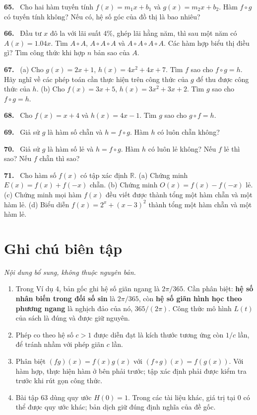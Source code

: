 \documentclass[12pt,a4paper]{article}
\newcommand{\bt}[1]{\par\smallskip\noindent\textbf{#1.}\ }
\begin{document}
\bt{65} Cho hai hàm tuyến tính $f(x)=m_1x+b_1$ và $g(x)=m_2x+b_2$. Hàm $f\circ g$ có tuyến tính không? Nếu có, hệ số góc của đồ thị là bao nhiêu?
\bt{66} Đầu tư $x$ đô la với lãi suất 4\%, ghép lãi hằng năm, thì sau một năm có $A(x)=1.04x$. Tìm $A\circ A$, $A\circ A\circ A$ và $A\circ A\circ A\circ A$. Các hàm hợp biểu thị điều gì? Tìm công thức khi hợp $n$ bản sao của $A$.
\bt{67} (a) Cho $g(x)=2x+1$, $h(x)=4x^2+4x+7$. Tìm $f$ sao cho $f\circ g=h$. Hãy nghĩ về các phép toán cần thực hiện trên công thức của $g$ để thu được công thức của $h$. (b) Cho $f(x)=3x+5$, $h(x)=3x^2+3x+2$. Tìm $g$ sao cho $f\circ g=h$.
\bt{68} Cho $f(x)=x+4$ và $h(x)=4x-1$. Tìm $g$ sao cho $g\circ f=h$.
\bt{69} Giả sử $g$ là hàm số chẵn và $h=f\circ g$. Hàm $h$ có luôn chẵn không?
\bt{70} Giả sử $g$ là hàm số lẻ và $h=f\circ g$. Hàm $h$ có luôn lẻ không? Nếu $f$ lẻ thì sao? Nếu $f$ chẵn thì sao?
\bt{71} Cho hàm số $f(x)$ có tập xác định $\mathbb R$. (a) Chứng minh $E(x)=f(x)+f(-x)$ chẵn. (b) Chứng minh $O(x)=f(x)-f(-x)$ lẻ. (c) Chứng minh mọi hàm $f(x)$ đều viết được thành tổng một hàm chẵn và một hàm lẻ. (d) Biểu diễn $f(x)=2^x+(x-3)^2$ thành tổng một hàm chẵn và một hàm lẻ.

\clearpage
\section*{Ghi chú biên tập}
\noindent\textit{Nội dung bổ sung, không thuộc nguyên bản.}
\begin{enumerate}[leftmargin=*,itemsep=5pt]
\item Trong Ví dụ 4, bản gốc ghi hệ số giãn ngang là $2\pi/365$. Cần phân biệt: \textbf{hệ số nhân biến trong đối số sin} là $2\pi/365$, còn \textbf{hệ số giãn hình học theo phương ngang} là nghịch đảo của nó, $365/(2\pi)$. Công thức mô hình $L(t)$ của sách là đúng và được giữ nguyên.
\item Phép co theo hệ số $c>1$ được diễn đạt là kích thước tương ứng còn $1/c$ lần, để tránh nhầm với phép giãn $c$ lần.
\item Phân biệt $(fg)(x)=f(x)g(x)$ với $(f\circ g)(x)=f(g(x))$. Với hàm hợp, thực hiện hàm ở bên phải trước; tập xác định phải được kiểm tra trước khi rút gọn công thức.
\item Bài tập 63 dùng quy ước $H(0)=1$. Trong các tài liệu khác, giá trị tại 0 có thể được quy ước khác; bản dịch giữ đúng định nghĩa của đề gốc.
\end{enumerate}
\end{document}
